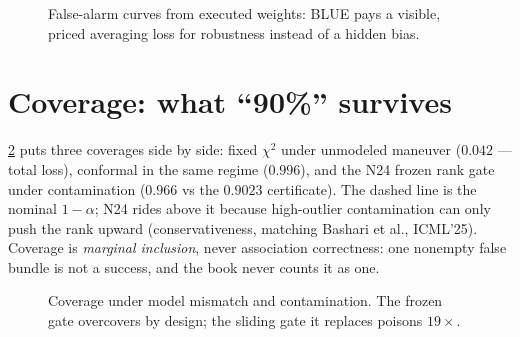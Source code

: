 \documentclass[11pt,oneside]{book}
\begin{document}
\begin{figure}[htbp]
\centering
{}
\caption{False-alarm curves from executed weights: BLUE pays a visible,
priced averaging loss for robustness instead of a hidden bias.}
\label{fig:pfa-curve}
\end{figure}

\section{Coverage: what ``90\%'' survives}
\label{sec:coverage}

\cref{fig:coverage} puts three coverages side by side: fixed $\chi^2$ under
unmodeled maneuver ($0.042$ --- total loss), conformal in the same regime
($0.996$), and the N24 frozen rank gate under contamination ($0.966$ vs the
$0.9023$ certificate). The dashed line is the nominal $1-\alpha$; N24 rides
above it because high-outlier contamination can only push the rank upward
(conservativeness, matching Bashari et al., ICML'25). Coverage is
\emph{marginal inclusion}, never association correctness: one nonempty false
bundle is not a success, and the book never counts it as one.

\begin{figure}[htbp]
\centering
{}
\caption{Coverage under model mismatch and contamination. The frozen gate
overcovers by design; the sliding gate it replaces poisons $19\times$.}
\label{fig:coverage}
\end{figure}
\end{document}
